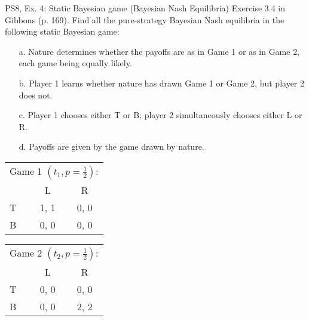 \begin{frame}{PS8, Ex. 4: Static Bayesian game (Bayesian Nash Equilibria)}
    Exercise 3.4 in Gibbons (p. 169). Find all the pure-strategy Bayesian Nash equilibria in the following static Bayesian game:
    \begin{itemize}
        \item[a.] Nature determines whether the payoffs are as in Game 1 or as in Game 2, each game being equally likely.
        \item[b.] Player 1 learns whether nature has drawn Game 1 or Game 2, but player 2 does not.
        \item[c.] Player 1 chooses either T or B; player 2 simultaneously chooses either L or R.
        \item[d.] Payoffs are given by the game drawn by nature.
    \end{itemize}
    \begin{table}
      \begin{tabular}{l|c|c|}
        \multicolumn{3}{c}{Game 1 $\left(t_1, p=\frac{1}{2}\right)$:}
        \\
        \multicolumn{1}{c}{} & \multicolumn{1}{c}{L} & \multicolumn{1}{c}{R} \\\cline{2-3}
        T & 1, 1 & 0, 0 \\\cline{2-3}
        B & 0, 0 & 0, 0 \\\cline{2-3}
      \end{tabular}
      \begin{tabular}{l|c|c|}
        \multicolumn{3}{c}{Game 2 $\left(t_2, p=\frac{1}{2}\right)$:}
        \\
        \multicolumn{1}{c}{} & \multicolumn{1}{c}{L} & \multicolumn{1}{c}{R} \\\cline{2-3}
        T & 0, 0 & 0, 0 \\\cline{2-3}
        B & 0, 0 & 2, 2 \\\cline{2-3}
      \end{tabular}
    \end{table}
    \vfill\null
\end{frame}

